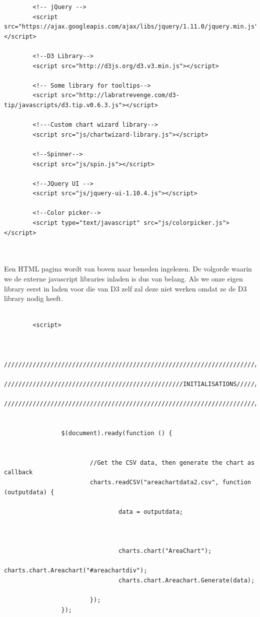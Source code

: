 \begin{lstlisting}
        <!-- jQuery -->
        <script src="https://ajax.googleapis.com/ajax/libs/jquery/1.11.0/jquery.min.js"></script>

        <!--D3 Library-->
        <script src="http://d3js.org/d3.v3.min.js"></script>

        <!-- Some library for tooltips-->
        <script src="http://labratrevenge.com/d3-tip/javascripts/d3.tip.v0.6.3.js"></script>

        <!---Custom chart wizard library-->
        <script src="js/chartwizard-library.js"></script>

        <!--Spinner-->
        <script src="js/spin.js"></script>

        <!--JQuery UI -->
        <script src="js/jquery-ui-1.10.4.js"></script>

        <!--Color picker-->
        <script type="text/javascript" src="js/colorpicker.js"></script>
        
        
\end{lstlisting}

Een HTML pagina wordt van boven naar beneden ingelezen. De volgorde waarin we de externe javascript libraries inladen is dus van belang. Als we onze eigen library eerst in laden voor die van D3 zelf zal deze niet werken omdat ze de D3 library nodig heeft.

\begin{lstlisting}        
        
        <script>
                     
                     
                 /////////////////////////////////////////////////////////////////////////////////////////////////////////////////////////////
                 //////////////////////////////////////////////////INITIALISATIONS////////////////////////////////////////////////////////////
                 /////////////////////////////////////////////////////////////////////////////////////////////////////////////////////////////	


                $(document).ready(function () {


                        //Get the CSV data, then generate the chart as callback
                        charts.readCSV("areachartdata2.csv", function (outputdata) {

                                data = outputdata;



                                charts.chart("AreaChart");
                                charts.chart.Areachart("#areachartdiv");
                                charts.chart.Areachart.Generate(data);

                        });
                });

\end{lstlisting}

